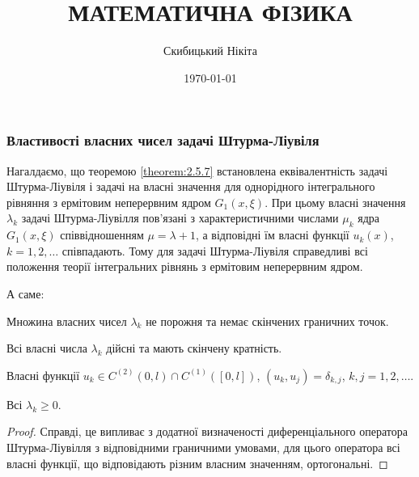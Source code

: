 

\title{{\Huge МАТЕМАТИЧНА ФІЗИКА}}
\author{Скибицький Нікіта}
\date{\today}





\tableofcontents

% 
% 
% 
% 
% 

\setcounter{section}{2}
\setcounter{subsection}{5}
\setcounter{subsubsection}{3}
\setcounter{theorem}{8}
\setcounter{equation}{36}

\subsubsection{Властивості власних чисел задачі Штурма-Ліувіля}

Нагалдаємо, що теоремою \ref{theorem:2.5.7} встановлена еквівалентність задачі Штурма-Ліувіля і задачі на власні значення для однорідного інтегрального рівняння з ермітовим неперервним ядром $G_1(x, \xi)$. При цьому власні значення $\lambda_k$ задачі Штурма-Ліувілля пов'язані з характеристичними числами $\mu_k$ ядра $G_1(x, \xi)$ співвідношенням $\mu = \lambda + 1$, а відповідні їм власні функції $u_k(x)$, $k = 1, 2, \ldots$ співпадають. Тому для задачі Штурма-Ліувіля справедливі всі положення теорії інтегральних рівнянь з ермітовим неперервним ядром. \medskip

А саме:
\begin{proposition}
	Множина власних чисел $\lambda_k$ не порожня та немає скінчених граничних точок.
\end{proposition}
	
\begin{proposition}
	Всі власні числа $\lambda_k$ дійсні та мають скінчену кратність.
\end{proposition}
	
\begin{proposition}
	Власні функції $u_k\in C^{(2)}(0,l)\cap C^{(1)}([0, l])$, $(u_k, u_j) = \delta_{k,j}$, $k,j=1,2,\ldots$.
\end{proposition}
	
\begin{proposition}
	Всі $\lambda_k \ge 0$.
\end{proposition}

\begin{proof}
	Справді, це випливає з додатної визначеності диференціального оператора Штурма-Ліувілля з відповідними граничними умовами, для цього оператора всі власні функції, що відповідають різним власним значенням, ортогональні.
\end{proof}

